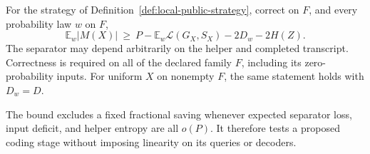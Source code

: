 \begin{theorem}\label{thm:local-adaptive-separator}
For the strategy of Definition~\ref{def:local-public-strategy}, correct on
$F$, and every probability law $w$ on $F$,
\begin{equation}\label{eq:local-adaptive-separator}
  \mathbb E_w|M(X)|
  \ \ge\ P-\mathbb E_w\mathcal L(G_X,S_X)-2D_w-2H(Z).
\end{equation}
The separator may depend arbitrarily on the helper and completed transcript.
Correctness is required on all of the declared family $F$, including its
zero-probability inputs.  For uniform $X$ on nonempty $F$, the same statement
holds with $D_w=D$.
\end{theorem}

The bound excludes a fixed fractional saving whenever expected separator loss, input
deficit, and helper entropy are all $o(P)$.  It therefore tests a proposed
coding stage without imposing linearity on its queries or decoders.

